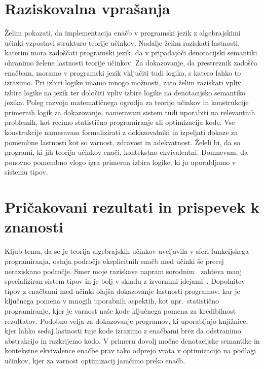 \documentclass{article}
\begin{document}
\section*{Raziskovalna vprašanja}

Želim pokazati, da implementacija enačb v programski jezik z algebrajskimi učinki vzpostavi strukturo teorije učinkov. Nadalje želim raziskati lastnosti, katerim mora zadoščati programski jezik, da v pripadajoči denotacijski semantiki ohranimo želene lastnosti teorije učinkov. Za dokazovanje, da prestreznik zadošča enačbam, moramo v programski jezik vključiti tudi logiko, s katero lahko to izrazimo. Pri izbiri logike imamo mnogo možnosti, zato želim raziskati vpliv izbire logike na jezik ter določiti vpliv izbire logike na denotacijsko semantiko jezika. Poleg razvoja matematičnega ogrodja za teorijo učinkov in konstrukcije primernih logik za dokazovanje, nameravam sistem tudi uporabiti na relevantnih problemih, kot recimo statistično programiranje ali optimizacija kode. Vse konstrukcije nameravam formalizirati z dokazovalniki in izpeljati dokaze za pomembne lastnosti kot so varnost, zdravost in adekvatnost. Želeli bi, da so programi, ki jih teorija učinkov enači, kontekstno ekvivalentni. Domnevam, da ponovno pomembno vlogo igra primerna izbira logike, ki jo uporabljamo v sistemu tipov. 

\section*{Pričakovani rezultati in prispevek k znanosti}

Kljub temu, da se je teorija algebrajskih učinkov uveljavila v sferi funkcijskega programiranja, ostaja področje eksplicitnih enačb med učinki še precej neraziskano področje. Smer moje raziskave napram sorodnim~\cite{DBLP:journals/pacmpl/Ahman18} zahteva manj specializiran sistem tipov in je bolj v skladu z izvornimi idejami~\cite{DBLP:conf/esop/PlotkinP09}. Dopolnitev tipov z enačbami med učinki olajša dokazovanje lastnosti programov, kar je ključnega pomena v mnogih uporabnih aspektih, kot npr.\ statistično programiranje, kjer je varnost naše kode ključnega pomena za kredibilnost rezultatov. Podobno velja za dokazovanje programov, ki uporabljajo knjižnice, kjer lahko sedaj lastnosti tuje kode izrazimo z enačbami brez da odstranimo abstrakcijo in razkrijemo kodo. V primeru dovolj močne denotacijske semantike in kontekstne ekvivalence enačbe prav tako odprejo vrata v optimizacijo na podlagi učinkov, kjer za varnost optimizacij jamčimo preko enačb.

\renewcommand\refname{Literatura}


\end{document}

